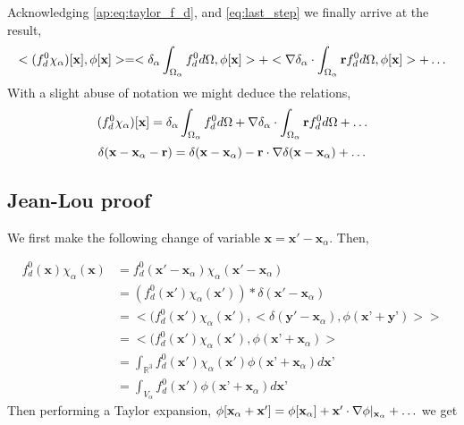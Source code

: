 Acknowledging \ref{ap:eq:taylor_f_d}, and \ref{eq:last_step} we finally arrive at the result, 
\begin{align}
    <   (f^0_d \chi_\alpha)[\textbf{x}]
    , \phi[\textbf{x}]> 
    = 
    <\delta_\alpha
    \intO{
        f^0_d
    }
    , \phi[\textbf{x}]>
    + < \grad\delta_\alpha
    \cdot 
    \intO{
    \textbf{r}
    f^0_d
     }
     , \phi[\textbf{x}]>
    + \ldots
    \label{eq:last2_step}
\end{align}
With a slight abuse of notation we might deduce the relations, 
\begin{equation}
    (f^0_d \chi_\alpha)[\textbf{x}]
    = 
    \delta_\alpha
    \int_{\Omega_{\alpha}} 
        f^0_d
     d\Omega
    + \mathbf{\nabla}\delta_\alpha
    \cdot 
    \int_{\Omega_{\alpha}} 
    \textbf{r}
    f^0_d
      d\Omega
    + \ldots
\end{equation}
\begin{equation}
    \delta(\textbf{x}- \textbf{x}_\alpha - \textbf{r})
    = 
    \delta(\textbf{x}- \textbf{x}_\alpha)
    - \textbf{r}\cdot \mathbf{\nabla}\delta(\textbf{x}- \textbf{x}_\alpha)
    + \ldots
\end{equation}


\subsection{Jean-Lou proof}
We first make the following change of variable $\textbf{x} = \textbf{x} ' - \textbf{x}_\alpha$. Then,  

\begin{align}
f^0_d(\mathbf{x}) \chi_\alpha (\mathbf{x}) &= f^0_d(\textbf{x} ' - \textbf{x}_\alpha) \chi_\alpha (\textbf{x} ' - \textbf{x}_\alpha) \\
                               &= (f^0_d(\textbf{x}') \chi_\alpha (\textbf{x}'))*\delta(\textbf{x} ' - \textbf{x}_\alpha)\\
                               &=<   (f^0_d(\textbf{x}') \chi_\alpha(\textbf{x}'),< \delta(\textbf{y} '-\textbf{x}_\alpha),\phi(\textbf{x'}+\textbf{y'})>>\\
                               &= <   (f^0_d(\textbf{x}') \chi_\alpha(\textbf{x}'), \phi(\textbf{x'}+\textbf{x}_\alpha)> \\
                               &= \int_{\mathbb{R}^3} f^0_d(\textbf{x}') \chi_\alpha(\textbf{x}')\phi(\textbf{x'}+\textbf{x}_\alpha)d\textbf{x'} \\
                               &= \int_{V_\alpha} f^0_d(\textbf{x}')\phi(\textbf{x'}+\textbf{x}_\alpha)d\textbf{x'}
\end{align}
Then performing a Taylor expansion, $\phi[\textbf{x}_\alpha +\textbf{x}'] = \phi[\textbf{x}_\alpha] + \textbf{x}' \cdot \mathbf{\nabla} \phi|_{\textbf{x}_\alpha} + \ldots$ we get

